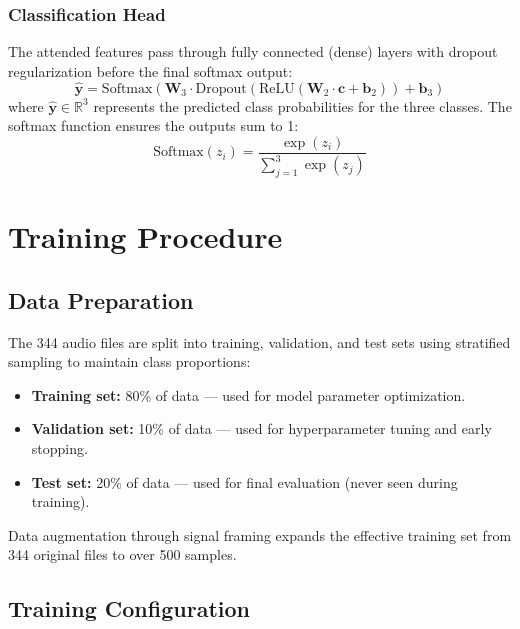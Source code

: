 \documentclass[12pt,a4paper]{report}
\begin{document}
\subsubsection{Classification Head}

The attended features pass through fully connected (dense) layers with dropout regularization before the final softmax output:
\begin{equation}
    \hat{\mathbf{y}} = \text{Softmax}(\mathbf{W}_3 \cdot \text{Dropout}(\text{ReLU}(\mathbf{W}_2 \cdot \mathbf{c} + \mathbf{b}_2)) + \mathbf{b}_3)
\end{equation}
where $\hat{\mathbf{y}} \in \mathbb{R}^3$ represents the predicted class probabilities for the three classes. The softmax function ensures the outputs sum to 1:
\begin{equation}
    \text{Softmax}(z_i) = \frac{\exp(z_i)}{\sum_{j=1}^{3} \exp(z_j)}
\end{equation}


\section{Training Procedure}
\label{sec:training}

\subsection{Data Preparation}

The 344 audio files are split into training, validation, and test sets using stratified sampling to maintain class proportions:
\begin{itemize}
    \item \textbf{Training set:} 80\% of data --- used for model parameter optimization.
    \item \textbf{Validation set:} 10\% of data --- used for hyperparameter tuning and early stopping.
    \item \textbf{Test set:} 20\% of data --- used for final evaluation (never seen during training).
\end{itemize}

Data augmentation through signal framing expands the effective training set from 344 original files to over 500 samples.

\subsection{Training Configuration}
\end{document}
